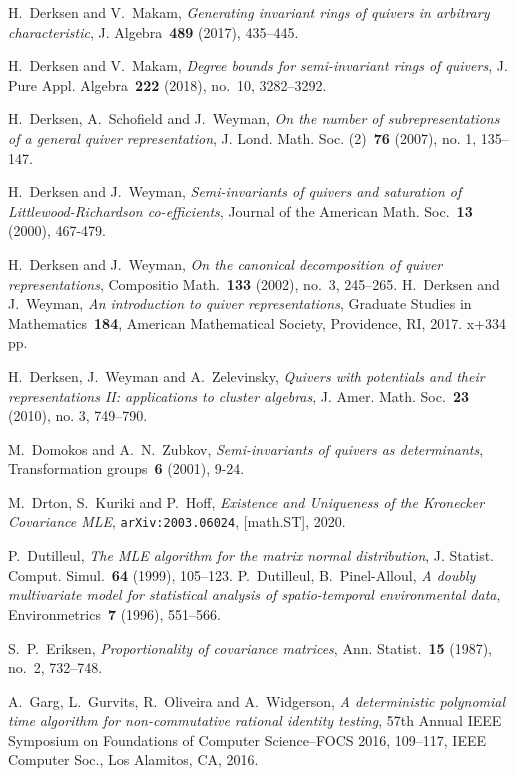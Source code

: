 \documentclass[11pt]{amsart}
\theoremstyle{definition}
\begin{document}
\begin{thebibliography}{99}
 H.~Derksen and V.~Makam, {\it Generating invariant rings of quivers in arbitrary characteristic}, J. Algebra~{\bf 489} (2017), 435--445.

 H.~Derksen and V.~Makam, {\it Degree bounds for semi-invariant rings of quivers}, J. Pure Appl. Algebra~{\bf 222} (2018), no.~10, 3282--3292.

 H.~Derksen, A.~Schofield and J.~Weyman, {\it On the number of subrepresentations of a general quiver representation}, J. Lond. Math. Soc. (2)~{\bf 76} (2007), no. 1, 135--147.

 H.~Derksen and J.~Weyman, {\it Semi-invariants of quivers and saturation of Littlewood-Richardson co-efficients}, Journal of the American Math. Soc.~{\bf 13} (2000), 467-479.


 H.~Derksen and J.~Weyman, {\it On the canonical decomposition of quiver representations}, Compositio Math.~{\bf 133} (2002), no.~3, 245--265.
 H.~Derksen and J.~Weyman, {\it An introduction to quiver representations}, Graduate Studies in Mathematics~{\bf 184}, American Mathematical Society, Providence, RI, 2017. x+334 pp. 



 H.~Derksen, J.~Weyman and A.~Zelevinsky, {\it Quivers with potentials and their representations II: applications to cluster algebras}, J. Amer. Math. Soc.~{\bf 23} (2010), no. 3, 749--790.

 M.~Domokos and A.~N.~Zubkov, {\it Semi-invariants of quivers as determinants}, Transformation groups~{\bf 6} (2001), 9-24.


 M.~Drton, S.~Kuriki and P.~Hoff, {\it Existence and Uniqueness of the Kronecker Covariance MLE}, {\tt arXiv:2003.06024}, [math.ST], 2020.


 P.~Dutilleul, {\it The MLE algorithm for the matrix normal distribution}, J. Statist. Comput. Simul.~{\bf 64} (1999), 105--123.
 P.~Dutilleul, B.~Pinel-Alloul, {\it A doubly multivariate model for statistical analysis of spatio-temporal environmental data}, Environmetrics~{\bf 7} (1996), 551--566.

 S.~P.~Eriksen, {\it Proportionality of covariance matrices}, Ann. Statist.~{\bf 15} (1987), no.~2, 732--748.

A.~Garg, L.~Gurvits, R.~Oliveira and A.~Widgerson, {\it A deterministic polynomial time algorithm for non-commutative rational identity testing}, 57th Annual IEEE Symposium on Foundations of Computer Science--FOCS 2016, 109--117, IEEE Computer Soc., Los Alamitos, CA, 2016.


\end{thebibliography}
\end{document}
